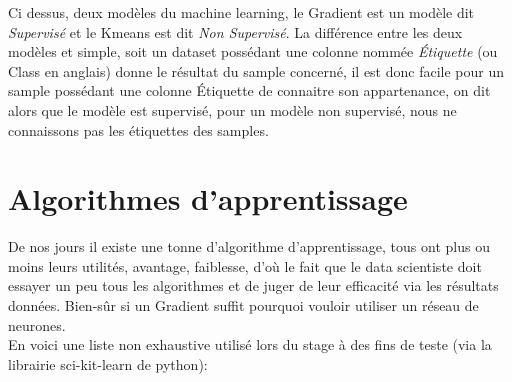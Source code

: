 Ci dessus, deux modèles du machine learning, le Gradient est un modèle dit \textit{Supervisé} et le Kmeans est dit \textit{Non Supervisé}. La différence entre les deux modèles et simple, soit un dataset possédant une colonne nommée \textit{Étiquette} (ou Class en anglais) donne le résultat du sample concerné, il est donc facile pour un sample possédant une colonne Étiquette de connaitre son appartenance, on dit alors que le modèle est supervisé, pour un modèle non supervisé, nous ne connaissons pas les étiquettes des samples.\\
\pagebreak

\section{Algorithmes d'apprentissage}

De nos jours il existe une tonne d'algorithme d'apprentissage, tous ont plus ou moins leurs utilités, avantage, faiblesse, d'où le fait que le data scientiste doit essayer un peu tous les algorithmes et de juger de leur efficacité via les résultats données. Bien-sûr si un Gradient suffit pourquoi vouloir utiliser un réseau de neurones.\\
En voici une liste non exhaustive utilisé lors du stage à des fins de teste (via la librairie sci-kit-learn de python):

